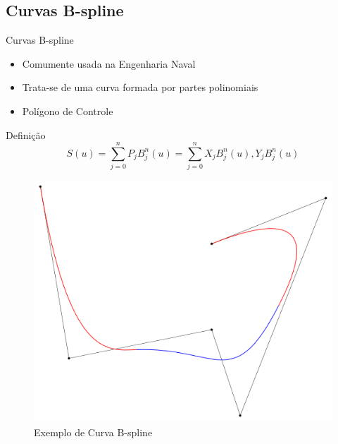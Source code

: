 \documentclass{beamer}
\begin{document}
\subsection{Curvas B-spline}
\begin{frame}{Curvas B-spline}
\begin{itemize}
\item Comumente usada na Engenharia Naval
\item Trata-se de uma curva formada por partes polinomiais
\item Polígono de Controle 
\end{itemize}

\begin{block}{Definição}
	\begin{equation}
		S(u) = \sum_{j = 0}^{n} {P_j B_j^n(u)} = \sum_{j = 0}^{n} {X_j B_j^n(u),Y_j B_j^n(u)}
	\end{equation}
\end{block}

\begin{figure}[h]
	\centering
	\includegraphics[scale=0.2]{bspline}
	\caption{Exemplo de Curva B-spline}
	\label{fig:bspline}
\end{figure}
\end{frame}

\end{document}
